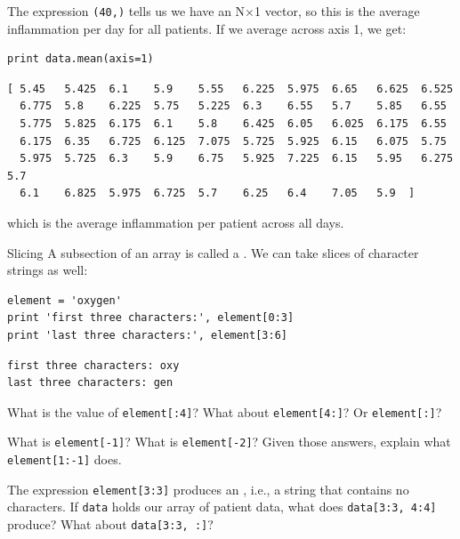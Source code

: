\documentclass{book}
\begin{document}
The expression \texttt{(40,)} tells us we have an N×1 vector, so this is
the average inflammation per day for all patients. If we average across
axis 1, we get:

\begin{verbatim}
print data.mean(axis=1)
\end{verbatim}

\begin{verbatim}
[ 5.45   5.425  6.1    5.9    5.55   6.225  5.975  6.65   6.625  6.525
  6.775  5.8    6.225  5.75   5.225  6.3    6.55   5.7    5.85   6.55
  5.775  5.825  6.175  6.1    5.8    6.425  6.05   6.025  6.175  6.55
  6.175  6.35   6.725  6.125  7.075  5.725  5.925  6.15   6.075  5.75
  5.975  5.725  6.3    5.9    6.75   5.925  7.225  6.15   5.95   6.275  5.7
  6.1    6.825  5.975  6.725  5.7    6.25   6.4    7.05   5.9  ]
\end{verbatim}

which is the average inflammation per patient across all days.

\begin{swcbox}{Slicing}
A subsection of an array is called a . We can
take slices of character strings as well:

\begin{verbatim}
element = 'oxygen'
print 'first three characters:', element[0:3]
print 'last three characters:', element[3:6]
\end{verbatim}

\begin{verbatim}
first three characters: oxy
last three characters: gen
\end{verbatim}
\end{swcbox}

\begin{challenge}
  What is the value of \texttt{element{[}:4{]}}? What about
  \texttt{element{[}4:{]}}? Or \texttt{element{[}:{]}}?
\end{challenge}

\begin{challenge}
  What is \texttt{element{[}-1{]}}? What is \texttt{element{[}-2{]}}?
  Given those answers, explain what \texttt{element{[}1:-1{]}} does.
\end{challenge}

\begin{challenge}
  The expression \texttt{element{[}3:3{]}} produces an
  , i.e., a string that contains
  no characters. If \texttt{data} holds our array of patient data, what
  does \texttt{data{[}3:3, 4:4{]}} produce? What about
  \texttt{data{[}3:3, :{]}}?
\end{challenge}
\end{document}
